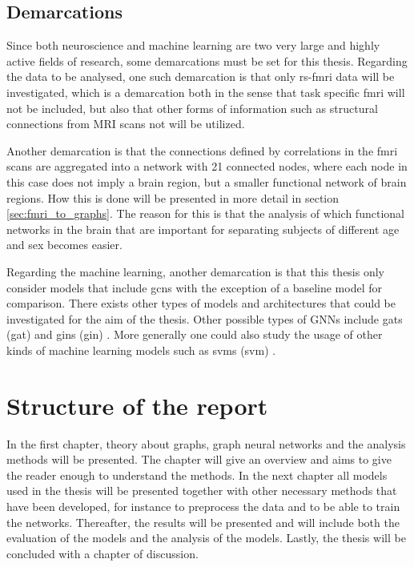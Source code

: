 

\subsection{Demarcations}
Since both neuroscience and machine learning are two very large and highly active fields of research, some demarcations must be set for this thesis. Regarding the data to be analysed, one such demarcation is that only \acrshort{rs-fmri} data will be investigated, which is a demarcation both in the sense that task specific \acrshort{fmri} will not be included, but also that other forms of information such as structural connections from MRI scans not will be utilized. 

Another demarcation is that the connections defined by correlations in the \acrshort{fmri} scans are aggregated into a network with 21 connected nodes, where each node in this case does not imply a brain region, but a smaller functional network of brain regions. How this is done will be presented in more detail in section \ref{sec:fmri_to_graphs}. The reason for this is that the analysis of which functional networks in the brain that are important for separating subjects of different age and sex becomes easier. 

Regarding the machine learning, another demarcation is that this thesis only consider models that include \acrshort{gcn}s with the exception of a baseline model for comparison. There exists other types of models and architectures that could be investigated for the aim of the thesis. Other possible types of GNNs include \acrlong{gat}s (\acrshort{gat}) \cite{gat} and \acrlong{gin}s (\acrshort{gin}) \cite{gin}. More generally one could also  study the usage of other kinds of machine learning models such as \acrlong{svm}s (\acrshort{svm}) \cite{neuro_ml}.


\section{Structure of the report}
In the first chapter, theory about graphs, graph neural networks and the analysis methods will be presented. The chapter will give an overview and aims to give the reader enough to understand the methods. In the next chapter all models used in the thesis will be presented together with other necessary methods that have been developed, for instance to preprocess the data and to be able to train the networks. Thereafter, the results will be presented and will include both the evaluation of the models and the analysis of the models. Lastly, the thesis will be concluded with a chapter of discussion. 


